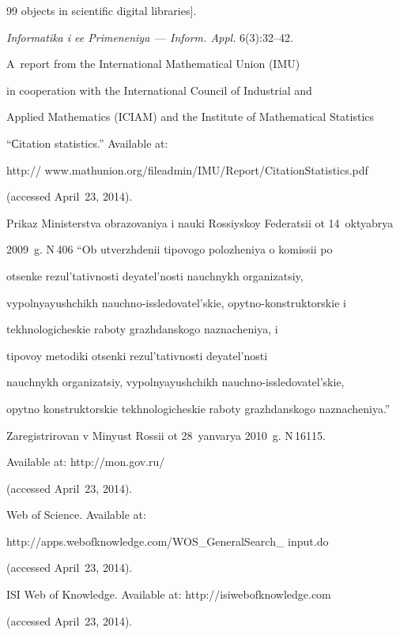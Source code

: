 {{\begin{thebibliography}{99}
objects in scientific digital libraries].


\textit{Informatika i ee Primeneniya}~--- \textit{Inform. Appl.} 6(3):32--42.




A~report from the International Mathematical Union (IMU)


in cooperation with the International Council of Industrial and


Applied Mathematics (ICIAM) and the Institute of Mathematical Statistics


``Сitation statistics.'' Available at:


{\sf http:// www.mathunion.org/fileadmin/IMU/Report/CitationStatistics.pdf}


(accessed April~23, 2014).




Prikaz Ministerstva obrazovaniya i nauki Rossiyskoy Federatsii ot 14~oktyabrya


2009~g. N\,406 ``Ob utverzhdenii tipovogo polozheniya o komissii po


otsenke rezul'tativnosti deyatel'nosti nauchnykh organizatsiy,


vypolnyayushchikh nauchno-issledovatel'skie, opytno-konstruktorskie i


tekhnologicheskie raboty grazhdanskogo naznacheniya, i


ti\-po\-voy metodiki otsenki rezul'tativnosti deyatel'nosti


nauchnykh organizatsiy, vypolnyayushchikh nauchno-issledovatel'skie,


opytno konstruktorskie tekhnologicheskie raboty grazhdanskogo naznacheniya.''


Zaregistrirovan v Minyust Rossii ot 28~yanvarya 2010~g. N\,16115.


Available at:  {\sf http://mon.gov.ru/}


(accessed April~23, 2014).




Web of Science. Available at:


{\sf http://apps.webofknowledge.com/WOS\_GeneralSearch\_ input.do}


(accessed April~23, 2014).




ISI Web of Knowledge.  Available at:  {\sf http://isiwebofknowledge.com}


(accessed April~23, 2014).





\end{thebibliography}}}
